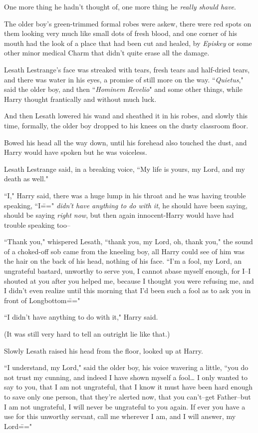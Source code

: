 One more thing he hadn't thought of, one more thing he \emph{really should have}.

The older boy's green-trimmed formal robes were askew, there were red spots on them looking very much like small dots of fresh blood, and one corner of his mouth had the look of a place that had been cut and healed, by \emph{Episkey} or some other minor medical Charm that didn't quite erase all the damage.

Lesath Lestrange's face was streaked with tears, fresh tears and half-dried tears, and there was water in his eyes, a promise of still more on the way. ``\emph{Quietus}," said the older boy, and then ``\emph{Hominem Revelio}" and some other things, while Harry thought frantically and without much luck.

And then Lesath lowered his wand and sheathed it in his robes, and slowly this time, formally, the older boy dropped to his knees on the dusty classroom floor.

Bowed his head all the way down, until his forehead also touched the dust, and Harry would have spoken but he was voiceless.

Lesath Lestrange said, in a breaking voice, ``My life is yours, my Lord, and my death as well."

``I," Harry said, there was a huge lump in his throat and he was having trouble speaking, ``I\===" \emph{didn't have anything to do with it}, he should have been saying, should be saying \emph{right now}, but then again innocent-Harry would have had trouble speaking too\---

``Thank you," whispered Lesath, ``thank you, my Lord, oh, thank you," the sound of a choked-off sob came from the kneeling boy, all Harry could see of him was the hair on the back of his head, nothing of his face. ``I'm a fool, my Lord, an ungrateful bastard, unworthy to serve you, I cannot abase myself enough, for I\---I shouted at you after you helped me, because I thought you were refusing me, and I didn't even realize until this morning that I'd been such a fool as to ask you in front of Longbottom\==="

``I didn't have anything to do with it," Harry said.

(It was still very hard to tell an outright lie like that.)

Slowly Lesath raised his head from the floor, looked up at Harry.

``I understand, my Lord," said the older boy, his voice wavering a little, ``you do not trust my cunning, and indeed I have shown myself a fool{\ldots} I only wanted to say to you, that I am not ungrateful, that I know it must have been hard enough to save only one person, that they're alerted now, that you can't\---get Father\---but I am not ungrateful, I will never be ungrateful to you again. If ever you have a use for this unworthy servant, call me wherever I am, and I will answer, my Lord\==="

